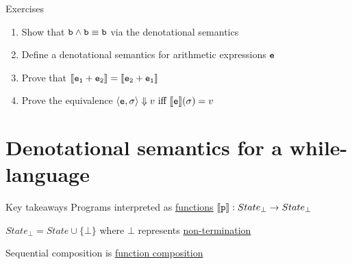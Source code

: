 \documentclass{beamer}
\begin{document}
\begin{frame}{Exercises}
        \begin{enumerate}
                \item Show that $\mathtt{b} \wedge \mathtt{b} \equiv \mathtt{b}$ via the
                        denotational semantics
                \item Define a denotational semantics for arithmetic
                        expressions $\mathtt{e}$
                \item Prove that $\llbracket \mathtt{e_1} + \mathtt{e_2} \rrbracket =
                        \llbracket \mathtt{e_2} + \mathtt{e_1} \rrbracket$
                \item Prove the equivalence $\langle \mathtt{e}, \sigma \rangle \Downarrow v
                        \text{ iff } \llbracket \mathtt{e} \rrbracket(\sigma) = v$
        \end{enumerate}
\end{frame}

\section{Denotational semantics for a while-language}

\begin{frame}{Key takeaways}
        Programs interpreted as \alert{\underline{functions}}
        $\llbracket \mathtt{p} \rrbracket : State_\bot \to State_\bot$

        $State_\bot = State \cup \{ \bot \}$ where $\bot$ represents
        \alert{\underline{non-termination}}

        Sequential composition is \alert{\underline{function composition}}
\end{frame}
\end{document}
